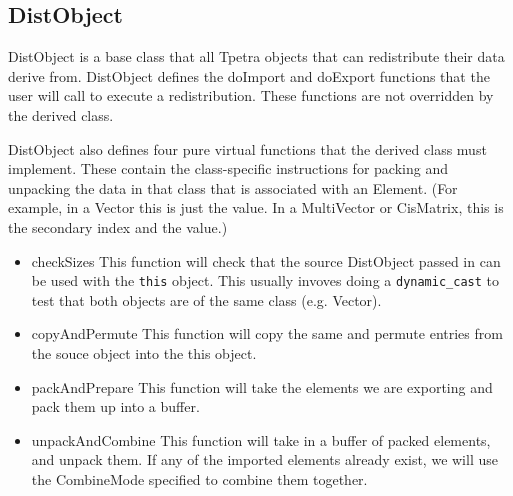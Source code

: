 \documentclass[10pt,relax]{TpetraDesign}
\begin{document}
%
\subsection{DistObject}

DistObject is a base class that all Tpetra objects that can redistribute their data derive from. DistObject defines the doImport and doExport functions that the user will call to execute a redistribution. These functions are not overridden by the derived class. 

DistObject also defines four pure virtual functions that the derived class must implement. These contain the class-specific instructions for packing and unpacking the data in that class that is associated with an Element. (For example, in a Vector this is just the value. In a MultiVector or CisMatrix, this is the secondary index and the value.)
\begin{itemize}
\item checkSizes This function will check that the source DistObject passed in can be used with the \texttt{this} object. This usually invoves doing a \texttt{dynamic\_cast} to test that both objects are of the same class (e.g. Vector).
\item copyAndPermute This function will copy the same and permute entries from the souce object into the this object.
\item packAndPrepare This function will take the elements we are exporting and pack them up into a buffer.
\item unpackAndCombine This function will take in a buffer of packed elements, and unpack them. If any of the imported elements already exist, we will use the CombineMode specified to combine them together.
\end{itemize}

%
\clearpage


\end{document}
